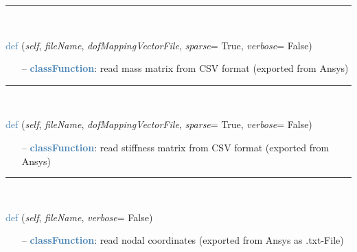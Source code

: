 \begin{itemize}[leftmargin=1.4cm]
\begin{itemize}[leftmargin=1.4cm]
\begin{itemize}[leftmargin=0.5cm]
\begin{itemize}[leftmargin=1.4cm]
\begin{itemize}[leftmargin=1.4cm]
\begin{itemize}[leftmargin=0.5cm]
%
\noindent\rule{8cm}{0.75pt}\vspace{1pt} \\ 
\begin{flushleft}
\noindent \textcolor{steelblue}{def {\bf {}}}\label{sec:FEM:FEMinterface:ReadMassMatrixFromAnsys}
({\it self}, {\it fileName}, {\it dofMappingVectorFile}, {\it sparse}= True, {\it verbose}= False)
\end{flushleft}
\setlength{\itemindent}{0.7cm}
\begin{itemize}[leftmargin=0.7cm]
\item[--]\textcolor{steelblue}{\bf classFunction}: read mass matrix from CSV format (exported from Ansys)
\vspace{12pt}\end{itemize}
%
\noindent\rule{8cm}{0.75pt}\vspace{1pt} \\ 
\begin{flushleft}
\noindent \textcolor{steelblue}{def {\bf {}}}\label{sec:FEM:FEMinterface:ReadStiffnessMatrixFromAnsys}
({\it self}, {\it fileName}, {\it dofMappingVectorFile}, {\it sparse}= True, {\it verbose}= False)
\end{flushleft}
\setlength{\itemindent}{0.7cm}
\begin{itemize}[leftmargin=0.7cm]
\item[--]\textcolor{steelblue}{\bf classFunction}: read stiffness matrix from CSV format (exported from Ansys)
\vspace{12pt}\end{itemize}
%
\noindent\rule{8cm}{0.75pt}\vspace{1pt} \\ 
\begin{flushleft}
\noindent \textcolor{steelblue}{def {\bf {}}}\label{sec:FEM:FEMinterface:ReadNodalCoordinatesFromAnsys}
({\it self}, {\it fileName}, {\it verbose}= False)
\end{flushleft}
\setlength{\itemindent}{0.7cm}
\begin{itemize}[leftmargin=0.7cm]
\item[--]\textcolor{steelblue}{\bf classFunction}: read nodal coordinates (exported from Ansys as .txt-File)

\end{itemize}
\end{itemize}
\end{itemize}
\end{itemize}
\end{itemize}
\end{itemize}
\end{itemize}
